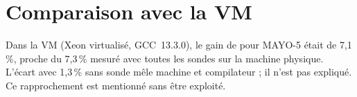 \section{Comparaison avec la VM}
\F{} Dans la VM (Xeon virtualisé, GCC~13.3.0), le gain de  pour MAYO-5 était de 7,1\,\%, proche du 7,3\,\% mesuré avec toutes les sondes sur la machine physique. \Hy{} L'écart avec 1,3\,\% sans sonde mêle machine et compilateur ; il n'est pas expliqué. Ce rapprochement est mentionné sans être exploité.
